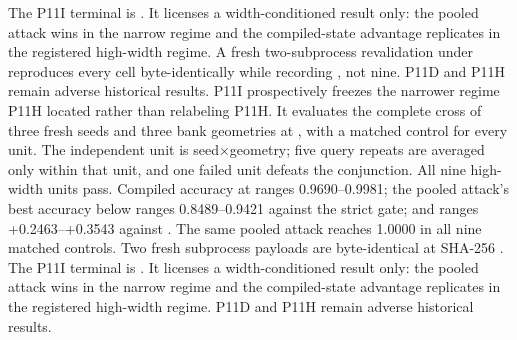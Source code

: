 {}The P11I terminal is . It licenses a width-conditioned result only: the pooled attack wins in the narrow regime and the compiled-state advantage replicates in the registered high-width regime. A fresh two-subprocess revalidation under  reproduces every cell byte-identically while recording , not nine. P11D and P11H remain adverse historical results.
{}P11I prospectively freezes the narrower regime P11H located rather than relabeling P11H. It evaluates the complete cross of three fresh seeds and three bank geometries at , with a matched  control for every unit. The independent unit is seed×geometry; five query repeats are averaged only within that unit, and one failed unit defeats the conjunction.\markdownRendererInterblockSeparator
{}All nine high-width units pass. Compiled accuracy at  ranges 0.9690–0.9981; the pooled attack's best accuracy below  ranges 0.8489–0.9421 against the strict  gate; and  ranges +0.2463–+0.3543 against . The same pooled attack reaches 1.0000 in all nine matched  controls. Two fresh subprocess payloads are byte-identical at SHA-256 .\markdownRendererInterblockSeparator
{}The P11I terminal is . It licenses a width-conditioned result only: the pooled attack wins in the narrow regime and the compiled-state advantage replicates in the registered high-width regime. P11D and P11H remain adverse historical results.
\markdownRendererSectionEnd 
\markdownRendererSectionEnd \markdownRendererDocumentEnd